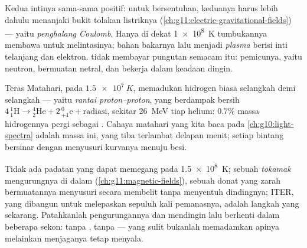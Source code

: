 \begin{definition}\label{def:g12:nuclear-energy:barrier}
Kedua intinya sama-sama positif: untuk bersentuhan, keduanya harus lebih dahulu menanjaki bukit
tolakan listriknya (\cref{ch:g11:electric-gravitational-fields}) --- yaitu
\emph{penghalang Coulomb}. Hanya di dekat \qty{1e8}{K}
tumbukannya membawa  untuk melintasinya; bahan bakarnya lalu menjadi
\emph{plasma} berisi inti telanjang dan elektron.  tidak membayar
pungutan semacam itu: pemicunya, yaitu neutron, bermuatan netral, dan bekerja dalam keadaan dingin.
\end{definition}

\begin{example}\label{ex:g12:nuclear-energy:sun}
Teras Matahari, pada $\qty{1.5e7}{K}$, memadukan hidrogen biasa selangkah demi selangkah ---
yaitu \emph{rantai proton--proton}, yang berdampak bersih
$4\,{}^{1}_{1}\mathrm{H} \to {}^{4}_{2}\mathrm{He} + 2\,{}^{0}_{+1}\mathrm{e}
+ \text{radiasi}$, sekitar \qty{26}{MeV} tiap helium: $0.7\%$ massa
hidrogennya pergi sebagai . Cahaya matahari yang  kita baca pada
\cref{ch:g10:light-spectra} adalah massa ini, yang tiba terlambat delapan menit; setiap
bintang bersinar dengan menyusuri kurvanya menuju besi.
\end{example}

\begin{remark}\label{rem:g12:nuclear-energy:iter}
Tidak ada padatan yang dapat memegang  pada \qty{1.5e8}{K}; sebuah \emph{tokamak} mengurungnya di dalam
 (\cref{ch:g11:magnetic-fields}), sebuah donat  yang
zarah bermuatannya menyusuri secara membelit tanpa menyentuh dindingnya; ITER, yang dibangun untuk
melepaskan sepuluh kali  pemanasnya, adalah langkah yang sekarang. Patahkanlah
pengurungannya dan  mendingin lalu berhenti dalam beberapa sekon: tanpa , tanpa
 --- yang sulit bukanlah memadamkan apinya melainkan menjaganya tetap menyala.
\end{remark}

